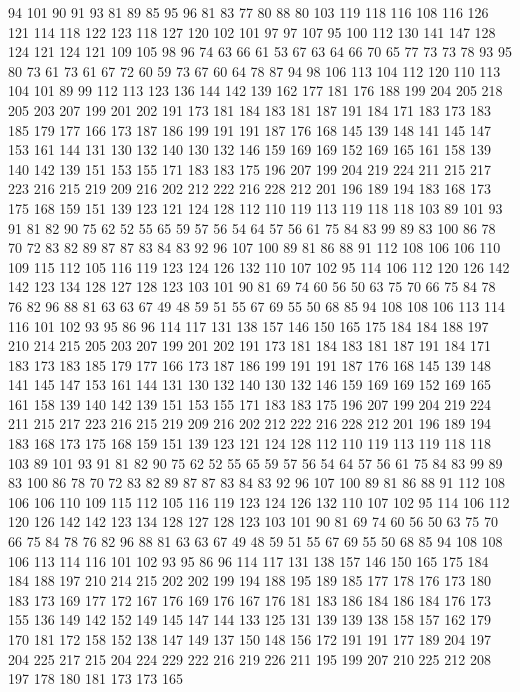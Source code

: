 94 101 90 91 93 81 89 85 95 96 81 83 77 80 88 80 103 119 118 116
108 116 126 121 114 118 122 123 118 127 120 102 101 97 97 107 95 100 112 130
141 147 128 124 121 124 121 109 105 98 96 74 63 66 61 53 67 63 64 66
70 65 77 73 73 78 93 95 80 73 61 73 61 67 72 60 59 73 67 60
64 78 87 94 98 106 113 104 112 120 110 113 104 101 89 99 112 113 123 136
144 142 139 162 177 181 176 188 199 204 205 218 205 203 207 199 201 202 191 173
181 184 183 181 187 191 184 171 183 173 183 185 179 177 166 173 187 186 199 191
191 187 176 168 145 139 148 141 145 147 153 161 144 131 130 132 140 130 132 146
159 169 169 152 169 165 161 158 139 140 142 139 151 153 155 171 183 183 175 196
207 199 204 219 224 211 215 217 223 216 215 219 209 216 202 212 222 216 228 212
201 196 189 194 183 168 173 175 168 159 151 139 123 121 124 128 112 110 119 113
119 118 118 103 89 101 93 91 81 82 90 75 62 52 55 65 59 57 56 54
64 57 56 61 75 84 83 99 89 83 100 86 78 70 72 83 82 89 87 87
83 84 83 92 96 107 100 89 81 86 88 91 112 108 106 106 110 109 115 112
105 116 119 123 124 126 132 110 107 102 95 114 106 112 120 126 142 142 123 134
128 127 128 123 103 101 90 81 69 74 60 56 50 63 75 70 66 75 84 78
76 82 96 88 81 63 63 67 49 48 59 51 55 67 69 55 50 68 85 94
108 108 106 113 114 116 101 102 93 95 86 96 114 117 131 138 157 146 150 165
175 184 184 188 197 210 214 215 205 203 207 199 201 202 191 173 181 184 183 181
187 191 184 171 183 173 183 185 179 177 166 173 187 186 199 191 191 187 176 168
145 139 148 141 145 147 153 161 144 131 130 132 140 130 132 146 159 169 169 152
169 165 161 158 139 140 142 139 151 153 155 171 183 183 175 196 207 199 204 219
224 211 215 217 223 216 215 219 209 216 202 212 222 216 228 212 201 196 189 194
183 168 173 175 168 159 151 139 123 121 124 128 112 110 119 113 119 118 118 103
89 101 93 91 81 82 90 75 62 52 55 65 59 57 56 54 64 57 56 61
75 84 83 99 89 83 100 86 78 70 72 83 82 89 87 87 83 84 83 92
96 107 100 89 81 86 88 91 112 108 106 106 110 109 115 112 105 116 119 123
124 126 132 110 107 102 95 114 106 112 120 126 142 142 123 134 128 127 128 123
103 101 90 81 69 74 60 56 50 63 75 70 66 75 84 78 76 82 96 88
81 63 63 67 49 48 59 51 55 67 69 55 50 68 85 94 108 108 106 113
114 116 101 102 93 95 86 96 114 117 131 138 157 146 150 165 175 184 184 188
197 210 214 215 202 202 199 194 188 195 189 185 177 178 176 173 180 183 173 169
177 172 167 176 169 176 167 176 181 183 186 184 186 184 176 173 155 136 149 142
152 149 145 147 144 133 125 131 139 139 138 158 157 162 179 170 181 172 158 152
138 147 149 137 150 148 156 172 191 191 177 189 204 197 204 225 217 215 204 224
229 222 216 219 226 211 195 199 207 210 225 212 208 197 178 180 181 173 173 165
